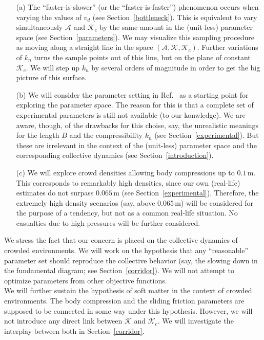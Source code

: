 \documentclass[preprint,12pt]{elsarticle}
\begin{document}
\begin{itemize}
 \item[(a)] The ``faster-is-slower'' (or the ``faster-is-faster'') phenomenon 
occurs when varying the values of $v_d$ (see Section~\ref{bottleneck}). This is 
equivalent to vary simultaneously $\mathcal{A}$ and $\mathcal{K}_c$ by the same 
amount in the (unit-less) parameter space (see Section~\ref{parameters}). We 
may visualize this sampling procedure as moving along a straight line in the 
space $(\mathcal{A},\mathcal{K},\mathcal{K}_c)$. Further variations of 
$k_n$ turns the sample points out of this line, but on the plane of constant
$\mathcal{K}_c$. We will step up $k_n$ by several orders of magnitude in order 
to get the big picture of this surface. 

\item[(b)] We will consider the parameter setting in Ref.~\cite{helbing_2000} 
as a starting point for exploring the parameter space. The reason for this is 
that a complete set of experimental parameters is still not available (to our 
konwledge). We are aware, though, of the drawbacks for this choise, say, the 
unrealistic meanings for the length $B$ and the compressibility $k_n$ (see 
Section~\ref{experimental}). But these are irrelevant in the context of the 
(unit-less) parameter space and the corresponding collective dynamics (see 
Section~\ref{introduction}). 

\item[(c)] We will explore crowd densities allowing body compressions up to 
$0.1\,$m. This corresponds to remarkably high densities, since our own 
(real-life) estimates do not surpass $0.065\,$m (see 
Section~\ref{experimental}). Therefore, the extremely high density 
scenarios (say, above $0.065\,$m) will be considered for the purpose of a 
tendency, but not as a common real-life situation. No casualties due to high 
pressures will be further considered. 

\end{itemize}

We stress the fact that our concern is placed on the collective dynamics of 
crowded environments. We will work on the hypothesis that any ``reasonable'' 
parameter set should reproduce the collective behavior (say, the slowing down 
in the fundamental diagram; see Section~\ref{corridor}). We will not attempt to 
optimize parameters from other objective functions. \\

We will further sustain the hypothesis of soft matter in the context of crowded 
environments. The body compression and the sliding friction parameters are 
supposed to be connected in some way under this hypothesis. However, we will 
not introduce any direct link between $\mathcal{K}$ and $\mathcal{K}_c$. We 
will investigate the interplay between both in Section~\ref{corridor}. 
\\
\end{document}
